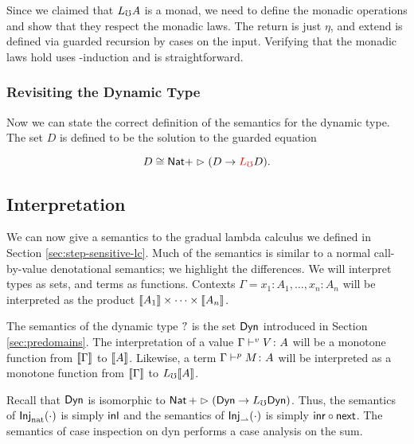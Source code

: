 Since we claimed that $L_\mho A$ is a monad, we need to define the monadic operations
and show that they respect the monadic laws. The return is just $\eta$, and extend
is defined via guarded recursion by cases on the input.
%
%
Verifying that the monadic laws hold uses \lob-induction and is straightforward.


\subsubsection{Revisiting the Dynamic Type}
Now we can state the correct definition of the semantics for the dynamic type.
The set $D$ is defined to be the solution to the guarded equation

\[ D \cong \mathsf{Nat} + \vartriangleright (D \to \textcolor{red}{L_\mho} D). \]


\subsection{Interpretation}\label{sec:term-interpretation}

We can now give a semantics to the gradual lambda calculus we defined
in Section \ref{sec:step-sensitive-lc}.
%
Much of the semantics is similar to a normal call-by-value denotational semantics;
we highlight the differences.
We will interpret types as sets, and terms as functions.
Contexts $\Gamma = x_1 \colon A_1, \dots, x_n \colon A_n$
will be interpreted as the product $\llbracket {A_1} \rrbracket \times \cdots \times \llbracket {A_n} \rrbracket$.


The semantics of the dynamic type $?$ is the set $\mathsf{Dyn}$ introduced in Section
\ref{sec:predomains}.
%
The interpretation of a value ${\Gamma} \vdash^v {V} \colon {A}$ will be a monotone function from
$\llbracket {\Gamma} \rrbracket$ to $\llbracket {A} \rrbracket$. Likewise, a term ${\Gamma} \vdash^p {M} \colon {{A}}$ will be interpreted
as a monotone function from $\llbracket {\Gamma} \rrbracket$ to $L_\mho \llbracket {A} \rrbracket$.

Recall that $\mathsf{Dyn}$ is isomorphic to $\mathsf{Nat}\, + \vartriangleright (\mathsf{Dyn} \to L_\mho \mathsf{Dyn})$.
Thus, the semantics of $\textsf{Inj}_\text{nat} ({\cdot})$ is simply $\mathsf{inl}$ and the semantics
of $\textsf{Inj}_\rightharpoonup ({\cdot})$ is simply $\mathsf{inr} \circ \mathsf{next}$.
The semantics of case inspection on dyn performs a case analysis on the sum.


